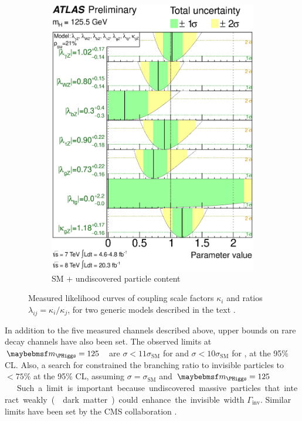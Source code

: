 \begin{figure}[t]
\begin{subfigure}[b]{0.495\textwidth}
		\includegraphics[width=\textwidth]{tex/conclusions/atlas_couplings_BSM}
		\caption{SM + undiscovered particle content}
		\label{fig:concl:couplings:BSM}
	\end{subfigure}
	\caption{Measured likelihood curves of coupling scale factors $\kappa_i$ and ratios 
	$\lambda_{ij} = \kappa_i / \kappa_j$, for two generic models described in the text 
	\cite{ATLAS:couplings:Moriond14}.}
	\label{fig:concl:couplings}
\end{figure}

In addition to the five measured channels described above, upper bounds on rare decay 
channels have also been set. The observed limits at \unit{$\mH = 125$}{\GeV} are 
$\sigma < 11\sigma_{\text{SM}}$ for \HepProcess{\PHiggs \HepTo \PZ\Pphoton} 
\cite{ATLAS:HZgam} and $\sigma < 10\sigma_{\text{SM}}$ for \HepProcess{\PHiggs \HepTo 
\Pmu\Pmu} \cite{ATLAS:Hmumu}, at the 95\% CL. Also, a search for \HepProcess{\ZH \HepTo 
\Plepton\Plepton\met} constrained the branching ratio to invisible particles to 
$< 75\%$ at the 95\% CL, assuming $\sigma = \sigma_{\text{SM}}$ and 
\unit{$\mH = 125$}{\GeV} \cite{ATLAS:Hinv}. Such a limit is important because 
undiscovered massive particles that interact weakly (\eg dark matter) could 
enhance the invisible width $\Gamma_{\text{inv}}$. Similar limits have been set by the 
CMS collaboration \cite{CMS:HZgam,CMS:Hmumu,CMS:Hinv}.



